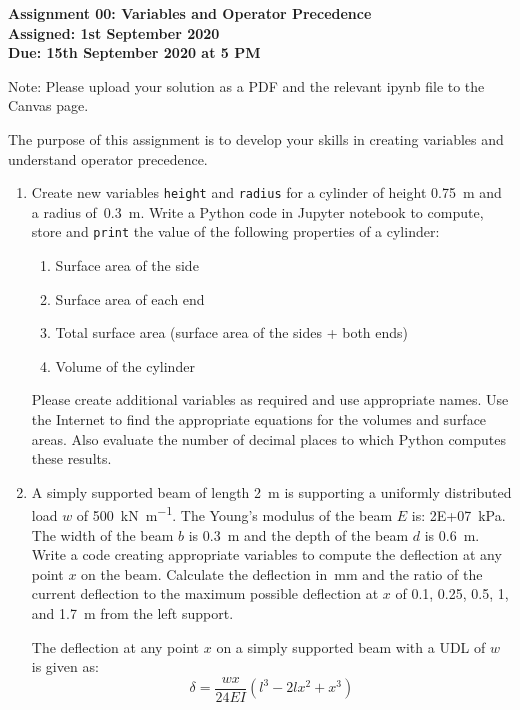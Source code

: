 \documentclass[a4paper,12pt]{article}
\begin{document}
\begin{centering}
	\textbf{
		Assignment 00: Variables and Operator Precedence\\
		Assigned: 1st September 2020\\
		Due: 15th September 2020 at 5 PM\\
	}
\end{centering}


Note: Please upload your solution as a PDF and the relevant ipynb file to the Canvas page.

\vspace{1em}
 
 The purpose of this assignment is to develop your skills in creating variables and understand operator precedence.
 
\begin{enumerate}
	\item Create new variables \verb|height| and \verb|radius| for a cylinder of height \SI{0.75}{\meter} and a radius of~\SI{0.3}{\meter}. Write a Python code in Jupyter notebook to compute, store and \verb|print| the value of the following properties of a cylinder:
	\begin{enumerate}
		\item Surface area of the side
		\item Surface area of each end
		\item Total surface area (surface area of the sides + both ends)
		\item Volume of the cylinder
	\end{enumerate}
	Please create additional variables as required and use appropriate names. Use the Internet to find the appropriate equations for the volumes and surface areas. Also evaluate the number of decimal places to which Python computes these results.
	
	\item A simply supported beam of length \SI{2}{\meter} is supporting a uniformly distributed load $w$ of \SI{500}{\kilo \newton \per \meter}. The Young's modulus of the beam $E$ is: \SI{2E+07}{\kilo\pascal}. The width of the beam $b$ is \SI{0.3}{\meter} and the depth of the beam $d$ is \SI{0.6}{\meter}. Write a code creating appropriate variables to compute the deflection at any point $x$ on the beam. Calculate the deflection in~\si{\milli\meter} and the ratio of the current deflection to the maximum possible deflection at $x$ of 0.1, 0.25, 0.5, 1, and 1.7~\si{\meter} from the left support.
	
	The deflection at any point $x$ on a simply supported beam with a UDL of $w$ is given as:
	\begin{equation*}
		\delta = \frac{w x}{24 EI}(l^3 - 2lx^2 + x^3)
	\end{equation*}
	

\end{enumerate}
\end{document}
